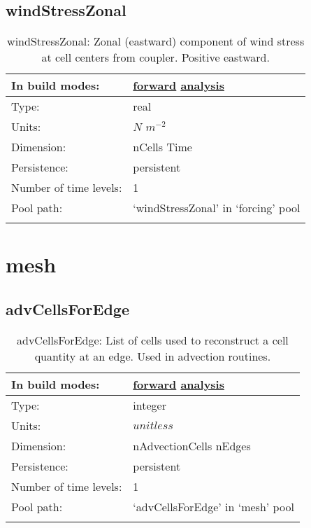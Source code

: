 \subsection[windStressZonal]{windStressZonal}
\label{subsec:var_sec_forcing_windStressZonal}
\begin{center}
\begin{longtable}{| p{2.0in} | p{4.0in} |}
        \hline 
        In build modes: & \hyperref[subsec:forward_var_tab_forcing]{forward} \hyperref[subsec:analysis_var_tab_forcing]{analysis} \\
        \hline 
        Type: & real \\
        \hline 
        Units: & $N$ $m^{-2}$ \\
        \hline 
        Dimension: & nCells Time \\
        \hline 
        Persistence: & persistent \\
        \hline 
        Number of time levels: & 1 \\
        \hline 
            Pool path: & `windStressZonal' in `forcing' pool \\
		 \hline 
    \caption{windStressZonal: Zonal (eastward) component of wind stress at cell centers from coupler. Positive eastward.}
\end{longtable}
\end{center}
\section[mesh]{mesh}
\label{sec:var_sec_mesh}
\subsection[advCellsForEdge]{advCellsForEdge}
\label{subsec:var_sec_mesh_advCellsForEdge}
\begin{center}
\begin{longtable}{| p{2.0in} | p{4.0in} |}
        \hline 
        In build modes: & \hyperref[subsec:forward_var_tab_mesh]{forward} \hyperref[subsec:analysis_var_tab_mesh]{analysis} \\
        \hline 
        Type: & integer \\
        \hline 
        Units: & $unitless$ \\
        \hline 
        Dimension: & nAdvectionCells nEdges \\
        \hline 
        Persistence: & persistent \\
        \hline 
        Number of time levels: & 1 \\
        \hline 
            Pool path: & `advCellsForEdge' in `mesh' pool \\
		 \hline 
    \caption{advCellsForEdge: List of cells used to reconstruct a cell quantity at an edge. Used in advection routines.}
\end{longtable}
\end{center}
